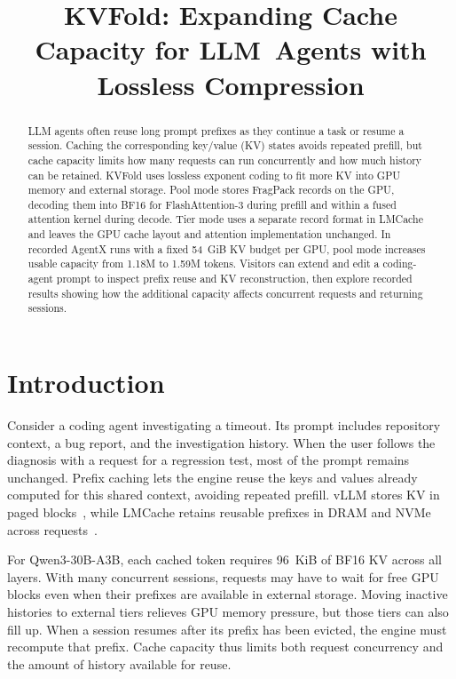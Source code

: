 \documentclass[conference]{IEEEtran}
\title{KVFold: Expanding Cache Capacity for \mbox{LLM Agents} with Lossless Compression}
\author{\IEEEauthorblockN{Working draft}
\IEEEauthorblockA{Author information to be supplied}}
\begin{document}
\maketitle

\begin{abstract}
LLM agents often reuse long prompt prefixes as they continue a task or
resume a session. Caching the corresponding key/value (KV) states avoids
repeated prefill, but cache capacity limits how many requests can run
concurrently and how much history can be retained. KVFold uses lossless
exponent coding to fit more KV into GPU memory and external storage.
Pool mode stores FragPack records on the GPU, decoding them into BF16 for
FlashAttention-3 during prefill and within a fused attention kernel during
decode. Tier mode uses a separate record
format in LMCache and leaves the GPU cache layout and attention
implementation unchanged. In recorded AgentX runs with a fixed 54~GiB KV
budget per GPU, pool mode increases usable capacity from 1.18M to 1.59M
tokens. Visitors can extend and edit a coding-agent prompt to inspect
prefix reuse and KV reconstruction, then explore recorded results showing
how the additional capacity affects concurrent requests and returning
sessions.
\end{abstract}

\section{Introduction}
Consider a coding agent investigating a timeout. Its prompt includes
repository context, a bug report, and the investigation history. When the
user follows the diagnosis with a request for a regression test, most of
the prompt remains unchanged. Prefix caching lets the engine reuse the
keys and values already computed for this shared context, avoiding repeated
prefill. vLLM stores KV in paged blocks~\cite{vllm}, while LMCache retains
reusable prefixes in DRAM and NVMe across requests~\cite{lmcache}.

For Qwen3-30B-A3B, each cached token requires 96~KiB of BF16 KV across all
layers. With many concurrent sessions, requests may have to wait for free
GPU blocks even when their prefixes are available in external storage.
Moving inactive histories to external tiers relieves GPU memory pressure,
but those tiers can also fill up. When a session resumes after its prefix
has been evicted, the engine must recompute that prefix. Cache capacity
thus limits both request concurrency and the amount of history available
for reuse.
\end{document}
